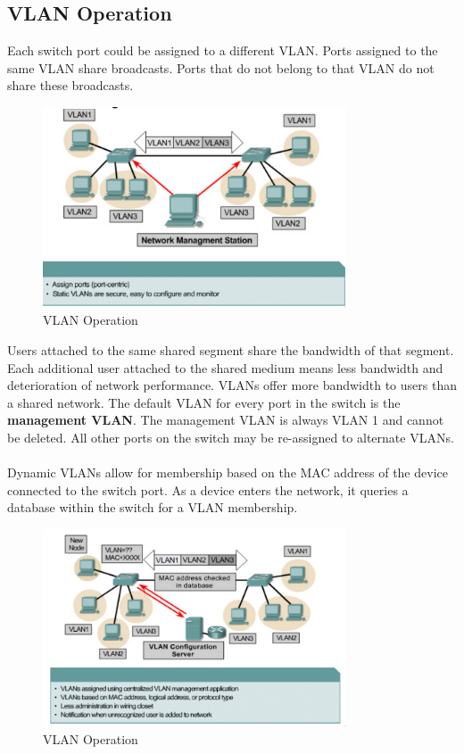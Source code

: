 \documentclass[a4paper,11pt]{article}
\begin{document}
\subsection{VLAN Operation}
Each switch port could be assigned to a different VLAN. 
Ports assigned to the same VLAN share broadcasts. 
Ports that do not belong to that VLAN do not share these broadcasts. 
\begin{figure}[H]
    \centering
    \includegraphics[width=0.8\textwidth]{./images/vlan_operation.png}
    \caption{VLAN Operation}
\end{figure}

Users attached to the same shared segment share the bandwidth of that segment. 
Each additional user attached to the shared medium means less bandwidth and deterioration of network performance. 
VLANs offer more bandwidth to users than a shared network. 
The default VLAN for every port in the switch is the \textbf{management VLAN}.
The management VLAN is always VLAN 1 and cannot be deleted. 
All other ports on the switch may be re-assigned to alternate VLANs.
\\\\ 
Dynamic VLANs allow for membership based on the MAC address of the device connected to the switch port. 
As a device enters the network, it queries a database within the switch for a VLAN membership. 
\begin{figure}[H]
    \centering
    \includegraphics[width=0.8\textwidth]{./images/vlan_operation1.png}
    \caption{VLAN Operation}
\end{figure}
\end{document}
